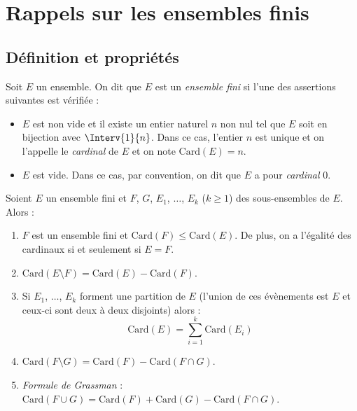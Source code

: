 \documentclass[a4paper,10pt]{report}
\begin{document}

\section{Rappels sur les ensembles finis}
\subsection{Définition et propriétés}

\begin{TheoremeDefinition}{} Soit $E$ un ensemble. On dit que $E$ est un \emph{ensemble fini} si l'une des assertions suivantes est vérifiée :
\begin{itemize}
\item $E$ est non vide et il existe un entier naturel $n$ non nul tel que $E$ soit en bijection avec $\Interv{1}{n}$. Dans ce cas, l'entier $n$ est unique et on l'appelle le \emph{cardinal} de $E$ et on note $\textrm{Card}(E)=n$.
\item $E$ est vide. Dans ce cas, par convention, on dit que $E$ a pour \emph{cardinal} $0$.
\end{itemize}
\end{TheoremeDefinition}

\begin{Proposition}{} Soient $E$ un ensemble fini et $F$, $G$, $E_1$, $\ldots$, $E_k$ ($k \geq 1$) des sous-ensembles de $E$. Alors :
\begin{enumerate}
\item $F$ est un ensemble fini et $\textrm{Card}(F) \leq \textrm{Card}(E) $. De plus, on a l'égalité des cardinaux si et seulement si $E=F$.
\item $\textrm{Card}(E \setminus F)= \textrm{Card}(E) - \textrm{Card}(F)$.
\item Si $E_1$, $\ldots$, $E_k$ forment une partition de $E$ (l'union de ces évènements est $E$ et ceux-ci sont deux à deux disjoints) alors :
$$ \textrm{Card}(E) = \sum_{i=1}^k \textrm{Card}(E_i) $$
\item $\textrm{Card}(F \setminus G) = \textrm{Card}(F) - \textrm{Card}(F \cap G)$.
\item \emph{Formule de Grassman} : $\textrm{Card}(F \cup G) = \textrm{Card}(F) + \textrm{Card}(G) - \textrm{Card}(F \cap G)$.
\end{enumerate}
\end{Proposition}
\end{document}
